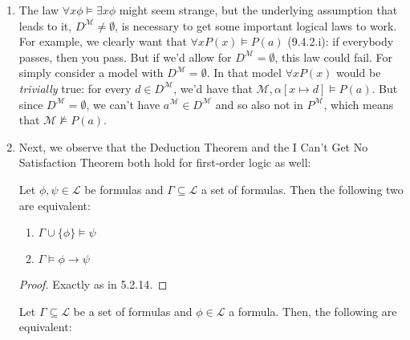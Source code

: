 \begin{enumerate}[\thesection.1]
\begin{proof}
\begin{enumerate}[(i)]
	
	
	\end{enumerate}
	
	\end{proof}
	
	
		\item \label{fo_sem_free} The law $\forall x\phi\vDash\exists x\phi$ might seem strange, but the underlying assumption that leads to it,  $D^\mathcal{M}\neq \emptyset$, is necessary to get some important logical laws to work. For example, we clearly want that $\forall xP(x)\vDash P(a)$ (9.4.2.i): if everybody passes, then you pass. But if we'd allow for $D^\mathcal{M}= \emptyset$, this law could fail. For simply consider a model with $D^\mathcal{M}= \emptyset$. In that model $\forall xP(x)$ would be \emph{trivially} true: for every $d\in D^\mathcal{M}$, we'd have that $\mathcal{M},\alpha[x\mapsto d]\vDash P(a)$. But since $D^\mathcal{M}= \emptyset$, we can't have $a^\mathcal{M}\in D^\mathcal{M}$ and so also not in $P^\mathcal{M}$, which means that $\mathcal{M}\nvDash P(a)$.
		
		
		\item Next, we observe that the Deduction Theorem and the I Can't Get No Satisfaction Theorem both hold for first-order logic as well:
		\begin{theorem}
			Let $\phi,\psi\in\mathcal{L}$ be formulas and $\Gamma\subseteq\mathcal{L}$ a set of formulas. Then the following two are equivalent:
			\begin{enumerate}[1.]
			
				\item $\Gamma\cup\{\phi\}\vDash\psi$
				
				\item $\Gamma\vDash \phi\to\psi$
			
			\end{enumerate}
			\end{theorem}
			\begin{proof}
			Exactly as in 5.2.14.
			\end{proof}
			\begin{theorem}
			Let $\Gamma\subseteq\mathcal{L}$ be a set of formulas and $\phi\in\mathcal{L}$ a formula. Then, the following are equivalent:
			\begin{enumerate}[1.]
			

\end{enumerate}
\end{theorem}
\end{enumerate}
